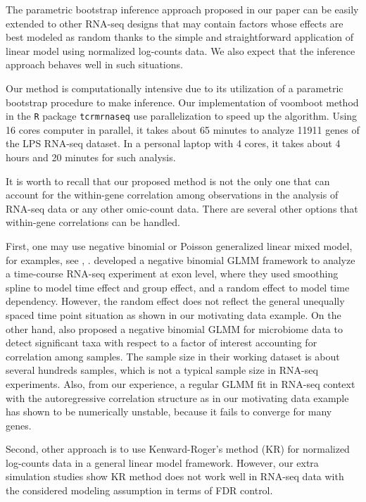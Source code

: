The parametric bootstrap inference approach proposed in our paper can be easily extended to other RNA-seq  designs that may contain factors whose effects are best modeled as random thanks to the simple and straightforward application of linear model using normalized log-counts data. We also expect that the inference approach behaves well in such situations.

Our method is computationally intensive due to its utilization of a parametric bootstrap procedure to make  inference. Our implementation of voomboot method in the \texttt{R} package \texttt{tcrmrnaseq}  use parallelization to speed up the algorithm. Using 16 cores computer in parallel, it takes about 65 minutes to analyze 11911 genes of the LPS RNA-seq dataset. In a personal laptop with 4 cores, it takes about 4 hours and 20 minutes for such analysis.

It is worth to recall that our proposed method is not the only  one that can account for the within-gene correlation among observations in the analysis of RNA-seq data or any other omic-count data. There are several other options that within-gene correlations can be handled.

First, one may use negative binomial or Poisson generalized linear mixed  model, for examples, see \citet{sun2016}, \citet{zhang2017}.  \citet{sun2016}  developed a negative binomial GLMM framework to analyze a time-course RNA-seq experiment at exon level, where they used smoothing spline to model time effect and group effect, and a random effect to model time dependency. However, the random effect does not reflect the general unequally spaced time point situation as shown in our motivating data example.
On the other hand, \citet{zhang2017} also proposed a negative binomial GLMM for microbiome data to detect significant taxa with respect to a factor of interest accounting for correlation among samples. The sample size in their working dataset is about several hundreds samples, which is not a typical sample size in RNA-seq experiments. Also, from our experience, a regular GLMM fit in RNA-seq context with the autoregressive correlation structure as in our motivating data example has shown to be numerically unstable, because it fails to converge for many genes.

Second, other approach is to use Kenward-Roger's method (KR) for normalized log-counts data in a general linear model framework. However, our extra simulation studies show KR method does not work well in RNA-seq data with the considered modeling assumption in terms of FDR control.

